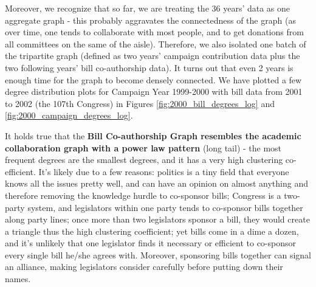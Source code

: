 \documentclass[12pt,twocolumn]{article}
\begin{document}
Moreover, we recognize that so far, we are treating the 36 years' data as one aggregate graph - this probably aggravates the connectedness of the graph (as over time, one tends to collaborate with most people, and to get donations from all committees on the same of the aisle). Therefore, we also isolated one batch of the tripartite graph (defined as two years' campaign contribution data plus the two following years' bill co-authorship data). It turns out that even 2 years is enough time for the graph to become densely connected. We have plotted a few degree distribution plots for Campaign Year 1999-2000 with bill data from 2001 to 2002 (the 107th Congress) in Figures \ref{fig:2000_bill_degrees_log} and \ref{fig:2000_campaign_degrees_log}. 

It holds true that the \textbf{Bill Co-authorship Graph resembles the academic collaboration graph with a power law pattern} (long tail) - the most frequent degrees are the smallest degrees, and it has a very high clustering co-efficient. It's likely due to a few reasons: politics is a tiny field that everyone knows all the issues pretty well, and can have an opinion on almost anything and therefore removing the knowledge hurdle to co-sponsor bills; Congress is a two-party system, and legislators within one party tends to co-sponsor bills together along party lines; once more than two legislators sponsor a bill, they would create a triangle thus the high clustering coefficient; yet bills come in a dime a dozen, and it's unlikely that one legislator finds it necessary or efficient to co-sponsor every single bill he/she agrees with. Moreover, sponsoring bills together can signal an alliance, making legislators consider carefully before putting down their names. 
\end{document}
